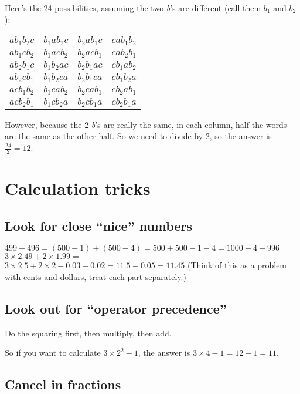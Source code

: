 \documentclass[fullpage,twocolumn]{article}
\begin{document}
Here's the 24 possibilities, assuming the two {\em b}'s are different (call
them $b_1$ and $b_2$):

\begin{tabular}{llll}
$a b_1 b_2 c $  & $ b_1 a b_2 c $ & $b_2 a b_1 c  $ & $c a b_1 b_2 $  \\
$a b_1 c b_2 $  & $ b_1 a c b_2 $ & $b_2 a c b_1  $ & $c a b_2 b_1 $  \\
$a b_2 b_1 c $  & $ b_1 b_2 a c $ & $b_2 b_1 a c  $ & $c b_1 a b_2 $  \\
$a b_2 c b_1 $  & $ b_1 b_2 c a $ & $b_2 b_1 c a  $ & $c b_1 b_2 a $  \\
$a c b_1 b_2 $  & $ b_1 c a b_2 $ & $b_2 c a b_1  $ & $c b_2 a b_1 $  \\
$a c b_2 b_1 $  & $ b_1 c b_2 a $ & $b_2 c b_1 a  $ & $c b_2 b_1 a $  \\
\end{tabular}

However, because the 2 {\em b}'s are really the same, in each
column, half the words are the same as the other half. So we need 
to divide by 2, so the answer is $\frac{24}{2} = 12$.

\section{Calculation tricks}

\subsection{Look for close ``nice'' numbers}
$499 + 496 = (500 - 1) + (500 - 4 ) = 500 + 500 - 1 - 4 = 1000 - 4 - 996$\\

$3 \times 2.49 + 2 \times 1.99 =$ \\
$ 3 \times 2.5 + 2 \times 2 - 0.03 - 0.02 = 11.5 - 0.05 = 11.45$
(Think of this as a problem with cents and dollars, treat each part separately.)

\subsection{Look out for ``operator precedence''}

Do the squaring first, then multiply, then add.  

So if you want to calculate $3 \times 2^2 - 1$, 
the answer is $3\times  4 -  1 = 12 - 1 = 11$.

\subsection{Cancel in fractions}
\end{document}
